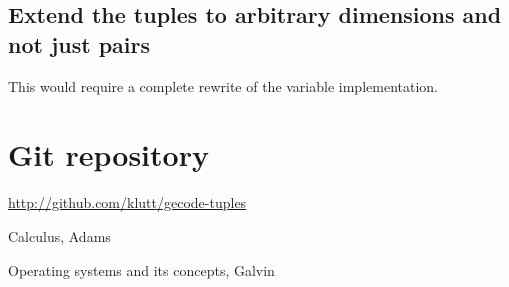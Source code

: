 \documentclass[a4paper,11pt]{article}
\begin{document}
\subsection{Extend the tuples to arbitrary dimensions and not just pairs}
This would require a complete rewrite of the variable implementation.

\section{Git repository}
\url{http://github.com/klutt/gecode-tuples}

\begin{thebibliography}{99}
	Calculus, 
	Adams
	
	Operating systems and its concepts,
	Galvin
\end{thebibliography}
\end{document}
